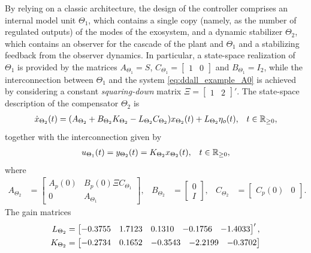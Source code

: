 \begin{example}
  By relying on a classic architecture, the design of the controller comprises an internal model unit $\Theta_1$, which contains a single copy (namely, as the number of regulated outputs) of the modes of the exosystem, and a dynamic stabilizer $\Theta_2$, which contains an observer for the cascade of the plant and $\Theta_1$ and a stabilizing feedback from the observer dynamics. In particular, a state-space realization of $\Theta_1$ is provided by the matrices $A_{\Theta_1} = S$, $C_{\Theta_1} = \begin{bmatrix}1 & 0\end{bmatrix}$ and $B_{\Theta_1} = I_2$, while the interconnection between $\Theta_1$ and the system \eqref{eq:ddall_example_A0} is achieved by considering a constant \emph{squaring-down} matrix $\Xi = \begin{bmatrix}1 & 2\end{bmatrix}'$. The state-space description of the compensator $\Theta_2$ is
  \begin{align}
    \label{eq:example_C2}
    \dot{x}_{\Theta_2}(t) &=	(A_{\Theta_2} + B_{\Theta_2}K_{\Theta_2}-L_{\Theta_2}C_{\Theta_2})x_{\Theta_2}(t) + L_{\Theta_2}\eta_o(t), & t\in\mathbb{R}_{\geq 0},
  \end{align}
  together with the interconnection given by
  \begin{align}
    u_{\Theta_1}(t) &= y_{\Theta_2}(t) = K_{\Theta_2}x_{\Theta_2}(t), & t\in\mathbb{R}_{\geq 0},
  \end{align}
  where
  \begin{align}
    \label{eq:ddall_example_AC2}
    A_{\Theta_2} &= \begin{bmatrix}A_p(0) & B_p(0)\Xi C_{\Theta_1} \\ 0 & A_{\Theta_1}\end{bmatrix}, & B_{\Theta_2} &= \begin{bmatrix}0 \\ I\end{bmatrix}, & C_{\Theta_2} &= \begin{bmatrix}C_p(0) & 0\end{bmatrix}.
  \end{align}
  The gain matrices
  \begin{subequations}
    \label{eq:ddall_example_KC2}
    \begin{align}
      L_{\Theta_2} & = \begin{bmatrix}-0.3755 & 1.7123 & 0.1310 & -0.1756 & -1.4033\end{bmatrix}', \\
      K_{\Theta_2} & = \begin{bmatrix}-0.2734 & 0.1652 & -0.3543 & -2.2199 & -0.3702 \\
\end{bmatrix}
\end{align}
\end{subequations}
\end{example}
